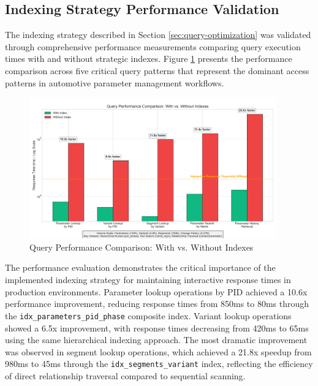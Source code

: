 \subsection{Indexing Strategy Performance Validation}
\label{subsec:indexing-strategy-performance}

The indexing strategy described in Section \ref{sec:query-optimization} was validated through comprehensive performance measurements comparing query execution times with and without strategic indexes. Figure \ref{fig:index-performance-comparison} presents the performance comparison across five critical query patterns that represent the dominant access patterns in automotive parameter management workflows.

\begin{figure}[h]
    \centering
    \includegraphics[width=0.95\textwidth]{figures/index_performance_comparison.png}
    \caption{Query Performance Comparison: With vs. Without Indexes}
    \label{fig:index-performance-comparison}
\end{figure}

The performance evaluation demonstrates the critical importance of the implemented indexing strategy for maintaining interactive response times in production environments. Parameter lookup operations by PID achieved a 10.6x performance improvement, reducing response times from 850ms to 80ms through the \texttt{idx\_parameters\_\allowbreak pid\_\allowbreak phase} composite index. Variant lookup operations showed a 6.5x improvement, with response times decreasing from 420ms to 65ms using the same hierarchical indexing approach. The most dramatic improvement was observed in segment lookup operations, which achieved a 21.8x speedup from 980ms to 45ms through the \texttt{idx\_segments\_variant} index, reflecting the efficiency of direct relationship traversal compared to sequential scanning.

